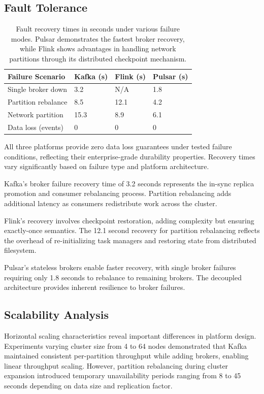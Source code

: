 \documentclass[10pt,twocolumn]{article}
\begin{document}
\subsection{Fault Tolerance}

\begin{table}[h]
\centering
\small
\begin{tabularx}{\columnwidth}{|l|X|X|X|}
\toprule
\textbf{Failure Scenario} & \textbf{Kafka (s)} & \textbf{Flink (s)} & \textbf{Pulsar (s)} \\
\midrule
Single broker down & 3.2 & N/A & 1.8 \\
Partition rebalance & 8.5 & 12.1 & 4.2 \\
Network partition & 15.3 & 8.9 & 6.1 \\
Data loss (events) & 0 & 0 & 0 \\
\bottomrule
\end{tabularx}
\caption{Fault recovery times in seconds under various failure modes. Pulsar demonstrates the fastest broker recovery, while Flink shows advantages in handling network partitions through its distributed checkpoint mechanism.}
\label{table:failover}
\end{table}

All three platforms provide zero data loss guarantees under tested failure conditions, reflecting their enterprise-grade durability properties. Recovery times vary significantly based on failure type and platform architecture.

Kafka's broker failure recovery time of 3.2 seconds represents the in-sync replica promotion and consumer rebalancing process. Partition rebalancing adds additional latency as consumers redistribute work across the cluster.

Flink's recovery involves checkpoint restoration, adding complexity but ensuring exactly-once semantics. The 12.1 second recovery for partition rebalancing reflects the overhead of re-initializing task managers and restoring state from distributed filesystem.

Pulsar's stateless brokers enable faster recovery, with single broker failures requiring only 1.8 seconds to rebalance to remaining brokers. The decoupled architecture provides inherent resilience to broker failures.

\subsection{Scalability Analysis}

Horizontal scaling characteristics reveal important differences in platform design. Experiments varying cluster size from 4 to 64 nodes demonstrated that Kafka maintained consistent per-partition throughput while adding brokers, enabling linear throughput scaling. However, partition rebalancing during cluster expansion introduced temporary unavailability periods ranging from 8 to 45 seconds depending on data size and replication factor.
\end{document}
